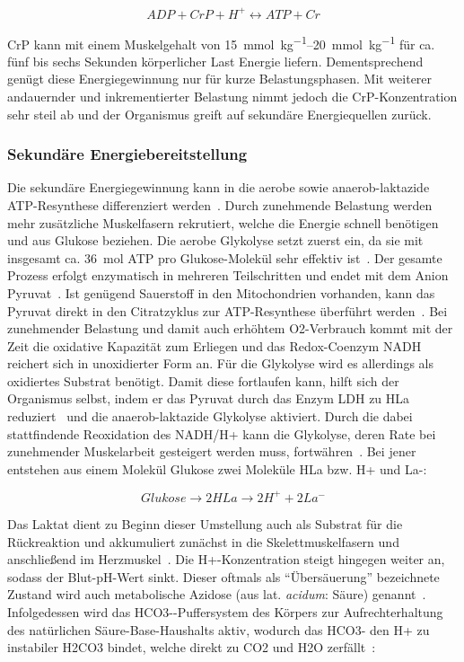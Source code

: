 \begin{equation}
ADP + CrP + H^+ \leftrightarrow ATP + Cr
\label{eq:formel3}
\end{equation}

\acs{CrP} kann mit einem Muskelgehalt von \SIrange{15}{20}{\milli\mole\per\kg} für ca. fünf bis sechs Sekunden körperlicher Last Energie liefern. Dementsprechend genügt diese Energiegewinnung nur für kurze Belastungsphasen. Mit weiterer andauernder und inkrementierter Belastung nimmt jedoch die \acs{CrP}-Konzentration sehr steil ab und der Organismus greift auf sekundäre Energiequellen zurück.

\subsubsection{Sekundäre Energiebereitstellung}

Die sekundäre Energiegewinnung kann in die aerobe sowie anaerob-laktazide ATP-Resynthese differenziert werden~\cite{Kroidl.2015}. Durch zunehmende Belastung werden mehr zusätzliche Muskelfasern rekrutiert, welche die Energie schnell benötigen und aus Glukose beziehen. Die aerobe Glykolyse setzt zuerst ein, da sie mit insgesamt ca. \SI{36}{\mole} ATP pro Glukose-Molekül sehr effektiv ist~\cite{Kroidl.2015}. Der gesamte Prozess erfolgt enzymatisch in mehreren Teilschritten und endet mit dem Anion Pyruvat~\cite{Heck.2006}. Ist genügend Sauerstoff in den Mitochondrien vorhanden, kann das Pyruvat direkt in den Citratzyklus zur ATP-Resynthese überführt werden~\cite{Rassow.2008}. Bei zunehmender Belastung und damit auch erhöhtem \acs{O2}-Verbrauch kommt mit der Zeit die oxidative Kapazität zum Erliegen und das Redox-Coenzym \acs{NADH} reichert sich in unoxidierter Form an. Für die Glykolyse wird es allerdings als oxidiertes Substrat benötigt. Damit diese fortlaufen kann, hilft sich der Organismus selbst, indem er das Pyruvat durch das Enzym \ac{LDH} zu \ac{HLa} reduziert~\cite{Rassow.2008} und die anaerob-laktazide Glykolyse aktiviert. Durch die dabei stattfindende Reoxidation des \acs{NADH}/\acs{H+} kann die Glykolyse, deren Rate bei zunehmender Muskelarbeit gesteigert werden muss, fortwähren~\cite{Heck.2006}. Bei jener entstehen aus einem Molekül Glukose zwei Moleküle \ac{HLa} bzw. \acs{H+} und \acs{La-}:

\begin{equation}
Glukose \rightarrow 2 HLa \rightarrow 2 H^+ + 2 La^-
\label{eq:formel4}
\end{equation}

Das Laktat dient zu Beginn dieser Umstellung auch als Substrat für die Rückreaktion und akkumuliert zunächst in die Skelettmuskelfasern und anschließend im Herzmuskel~\cite{Klinke.2003}. Die \acs{H+}-Konzentration steigt hingegen weiter an, sodass der Blut-pH-Wert sinkt. Dieser oftmals als "`Übersäuerung"' bezeichnete Zustand wird auch metabolische Azidose (aus lat. \textsl{acidum}: Säure) genannt~\cite{Boening.2008}. Infolgedessen wird das \acl{HCO3-}-Puffersystem des Körpers zur Aufrechterhaltung des natürlichen Säure-Base-Haushalts aktiv, wodurch das \acs{HCO3-} den \acs{H+} zu instabiler \ac{H2CO3} bindet, welche direkt zu \acs{CO2} und \acs{H2O} zerfällt~\cite{Kroidl.2015}:

